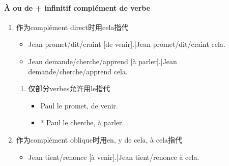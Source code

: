\documentclass[UTF8]{report}
\begin{document}
\paragraph{À ou de + infinitif complément de verbe}
\begin{enumerate}
    \item 作为complément direct时用cela指代
    \begin{itemize}
        \item Jean promet/dit/craint [de venir].|Jean promet/dit/craint cela.
        \item Jean demande/cherche/apprend [à parler].|Jean demande/cherche/apprend cela.
    \end{itemize}
    \begin{enumerate}
        \item 仅部分verbes允许用le指代
        \begin{itemize}
            \item Paul le promet, de venir.
            \item * Paul le cherche, à parler.
        \end{itemize}
    \end{enumerate}
    \item 作为complément oblique时用en, y de cela, à cela指代
    \begin{itemize}
        \item Jean tient/renonce [à venir].|Jean tient/renonce à cela.
    \end{itemize}
\end{enumerate}
\end{document}
